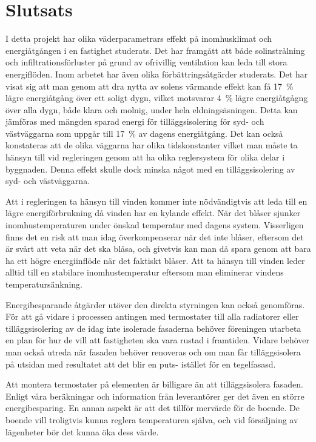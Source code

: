 \chapter{Slutsats}


I detta projekt har olika väderparametrars effekt på inomhusklimat och energiåtgången i en fastighet studerats.
Det har framgått att både solinstrålning och infiltrationsförluster på grund av ofrivillig
ventilation kan leda till stora energiflöden. Inom arbetet har även olika förbättringsåtgärder
studerats. Det har visat sig att man genom att dra nytta av solens värmande effekt kan få 17~\% lägre energiåtgång över ett soligt dygn, vilket motsvarar 4~\% lägre energiåtgågng över alla dygn, både klara och molnig, under hela eldningsäsningen. Detta kan jämföras med mängden sparad energi för tilläggsisolering för syd- och västväggarna som uppgår till 17~\% av dagens energiåtgång. Det kan också konstateras att de olika väggarna har olika tidskonstanter vilket man måste ta hänsyn till vid regleringen genom att ha olika reglersystem för olika delar i byggnaden. Denna effekt skulle dock minska något med en tilläggsisolering av syd- och västväggarna.

Att i regleringen ta hänsyn till vinden kommer inte nödvändigtvis att leda till en lägre energiförbrukning då vinden har en kylande effekt. När det blåser sjunker inomhustemperaturen under önskad temperatur med dagens system. Visserligen finns det en risk att man idag överkompenserar när det inte blåser, eftersom det är svårt att veta när det ska blåsa, och givetvis kan man då spara genom att bara ha ett högre energiinflöde när det faktiskt blåser. Att ta hänsyn till vinden leder alltid till en stabilare inomhustemperatur eftersom man eliminerar vindens temperatursänkning.

Energibesparande åtgärder utöver den direkta styrningen kan också genomföras. För att gå vidare i processen antingen med termostater till alla radiatorer eller tilläggsisolering av de idag inte isolerade fasaderna behöver föreningen utarbeta en plan för hur de vill att fastigheten ska vara rustad i framtiden. Vidare behöver man också utreda när fasaden behöver renoveras och om man får tilläggsisolera på utsidan med resultatet att det blir en puts- istället för en tegelfasasd.

Att montera termostater på elementen är billigare än att tilläggsisolera fasaden. Enligt våra beräkningar och information från leverantörer ger det även en större energibesparing. En annan aspekt är att det tillför mervärde för de boende. De boende vill troligtvis kunna reglera temperaturen själva, och vid försäljning av lägenheter bör det kunna öka dess värde.

